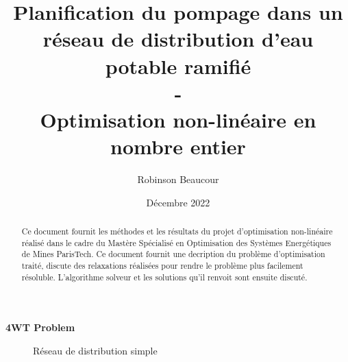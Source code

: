 \documentclass{article}
\title{Planification du pompage dans un réseau de distribution d'eau potable ramifié\\-\\Optimisation non-linéaire en nombre entier}
\author{Robinson Beaucour}
\date{Décembre 2022}
\begin{document}
\maketitle

\vspace{2cm}

\begin{abstract}
    Ce document fournit les méthodes et les résultats du projet d'optimisation non-linéaire réalisé dans le cadre du Mastère Spécialisé en Optimisation des Systèmes Energétiques de Mines ParisTech.
    Ce document fournit une decription du problème d'optimisation traité, discute des relaxations réalisées pour rendre le problème plus facilement résoluble. L'algorithme solveur et les solutions qu'il renvoit sont ensuite discuté.
\end{abstract}


\clearpage  

\begin{center}
    \large \textbf{4WT Problem}
\end{center}
\begin{figure}[h]
    \centering
    \caption{Réseau de distribution simple}
\end{figure}
\end{document}

